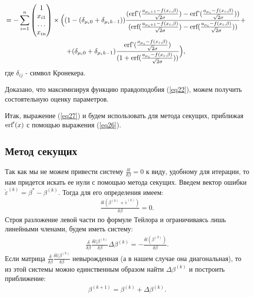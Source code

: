 \documentclass[a4paper,14pt]{extarticle}
\begin{document}
\begin{multline}
    \nonumber 
    =-\sum_{i=1}^{n}\begin{pmatrix}
        1\\
        x_{i1}\\
        \dots\\
        x_{in}
    \end{pmatrix}\times  \Big((1-(\delta_{\mu_i 0}+\delta_{\mu_i k-1}))\frac{(\textup{erf'}(\frac{a_{\mu_i+1}-f(x_i,\beta)}{\sqrt{2}\sigma})-\textup{erf'}(\frac{a_{\mu_i}-f(x_i,\beta)}{\sqrt{2}\sigma}))}{ (\textup{erf}(\frac{a_{\mu_i+1}-f(x_i,\beta)}{\sqrt{2}\sigma})-\textup{erf}(\frac{a_{\mu_i}-f(x_i,\beta)}{\sqrt{2}\sigma}))}+~\\
    +(\delta_{\mu_i 0}+\delta_{\mu_i k-1})\frac{\textup{erf'}(\frac{a_{\mu_i}-f(x_i,\beta)}{\sqrt{2}\sigma})}{(1+\textup{erf}(\frac{a_{\mu_i}-f(x_i,\beta)}{\sqrt{2}\sigma}))}\Big)  ,~
\end{multline}
где $\delta_{ij}$ - символ Кронекера.

Доказано, что максимизируя функцию правдоподобия (\ref{eq22}), можем получить состоятельную оценку\cite{OLSforGrouping} параметров.

Итак, выражение (\ref{eq27}) и будем использовать для метода секущих, приближая $\textup{erf}'(x)$ с помощью выражения (\ref{eq26}).

\subsection{Метод секущих}\label{sec4_2}
Так как мы не можем привести систему $ \frac{\delta l}{\delta \beta}=0$ к виду, удобному для итерации, то нам придется искать ее нули с помощью метода секущих.
Введем вектор ошибки $\check{\varepsilon}^{(k)}=\beta^{*}-\beta^{(k)}$. Тогда для его определения имеем:
\begin{eqnarray}
    \frac{\delta l (\beta^{(k)}+\check{\varepsilon}^{(k)})}{\delta \beta}=0.
\end{eqnarray}
Строя разложение левой части по формуле Тейлора и ограничиваясь лишь линейными членами\cite{NumericalMethods}, будем иметь систему:
\begin{eqnarray}
    \frac{\delta }{\delta \beta}\frac{\delta l (\beta^{(k)}}{\delta \beta}\Delta \beta^{(k)}=-\frac{\delta l (\beta^{(k)})}{\delta \beta}.
\end{eqnarray}
Если матрица $\frac{\delta }{\delta \beta}\frac{\delta l (\beta^{(k)}}{\delta \beta}$ невырожденная (а в нашем случае она диагональная), то из этой системы можно единственным образом найти $\Delta \beta^{(k)}$ и построить приближение:
\begin{eqnarray}
    \beta^{(k+1)}=\beta^{(k)}+\Delta \beta^{(k)}.
\end{eqnarray}
\end{document}
